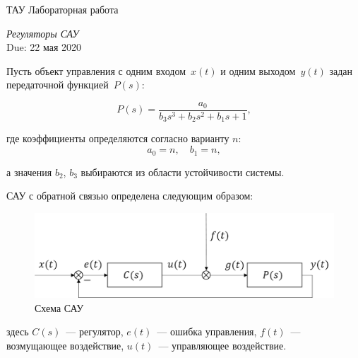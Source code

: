 \documentclass[a4paper,oneside,10pt]{book}
\theoremstyle{definition}
\begin{document}
	
	
	\begin{center}
		{\large  ТАУ \hspace{0.1cm} Лабораторная работа }
		
		\vspace{5pt}
		\textit{\large Регуляторы САУ}\\ %
		\vspace{10pt}
		Due: 22 мая 2020 %
	\end{center}
	
	\vspace{0.2 cm}
	
	
	
	Пусть объект управления с одним входом~$ x(t) $ и одним выходом~$ y(t) $ задан передаточной функцией~$ P(s) $: 
	
	\begin{equation*}
			P(s) = 
		\dfrac{a_0}
		{b_3 s^3 + b_2 s^2 + b_1 s +1} , 
	\end{equation*}
	
	где коэффициенты  определяются согласно варианту $ n $: 
	\begin{equation*}
		a_0 = n, \quad b_1 = n, 
	\end{equation*}
	
	а значения $b_2$, $b_3$ выбираются из области устойчивости системы. 
	
	САУ с обратной связью определена следующим образом:
	
	\begin{figure}[h]
        \centering
        \includegraphics[width=0.8\linewidth]{tau.png}
        \caption{Схема САУ} 
    \end{figure}
    здесь $C(s)$~--- регулятор, 
    $e(t)$~--- ошибка управления, 
    $f(t)$~--- возмущающее воздействие, 
    $u(t)$~--- управляющее воздействие.  
\end{document}
